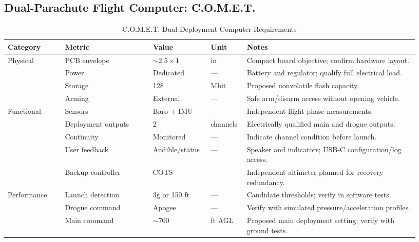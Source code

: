 \documentclass[11pt]{IEEEtran}
\newcommand{\comet}{C.O.M.E.T.}
\begin{document}
\subsection{Dual-Parachute Flight Computer: \comet{}}
\begin{table}[H]
\centering\small
\begin{tabular}{@{}p{0.13\linewidth}p{0.20\linewidth}p{0.13\linewidth}p{0.08\linewidth}p{0.39\linewidth}@{}}
\toprule
\textbf{Category} & \textbf{Metric} & \textbf{Value} & \textbf{Unit} & \textbf{Notes}\\
\midrule
\multirow{4}{*}{Physical}
 & PCB envelope & $\sim2.5\times1$ & in & Compact board objective; confirm hardware layout.\\ \cmidrule{2-5}
 & Power & Dedicated & --- & Battery and regulator; qualify full electrical load.\\ \cmidrule{2-5}
 & Storage & 128 & Mbit & Proposed nonvolatile flash capacity.\\ \cmidrule{2-5}
 & Arming & External & --- & Safe arm/disarm access without opening vehicle.\\
\midrule
\multirow{5}{*}{Functional}
 & Sensors & Baro + IMU & --- & Independent flight phase measurements.\\ \cmidrule{2-5}
 & Deployment outputs & 2 & channels & Electrically qualified main and drogue outputs.\\ \cmidrule{2-5}
 & Continuity & Monitored & --- & Indicate channel condition before launch.\\ \cmidrule{2-5}
 & User feedback & Audible/status & --- & Speaker and indicators; USB-C configuration/log access.\\ \cmidrule{2-5}
 & Backup controller & COTS & --- & Independent altimeter planned for recovery redundancy.\\
\midrule
\multirow{3}{*}{Performance}
 & Launch detection & 3g or 150 ft & --- & Candidate thresholds; verify in software tests.\\ \cmidrule{2-5}
 & Drogue command & Apogee & --- & Verify with simulated pressure/acceleration profiles.\\ \cmidrule{2-5}
 & Main command & $\sim700$ & ft AGL & Proposed main deployment setting; verify with ground tests.\\
\bottomrule
\end{tabular}
\vspace{3mm}
\caption{\comet{} Dual-Deployment Computer Requirements}
\label{tab:COMET_Requirements_Table}
\end{table}
\end{document}
